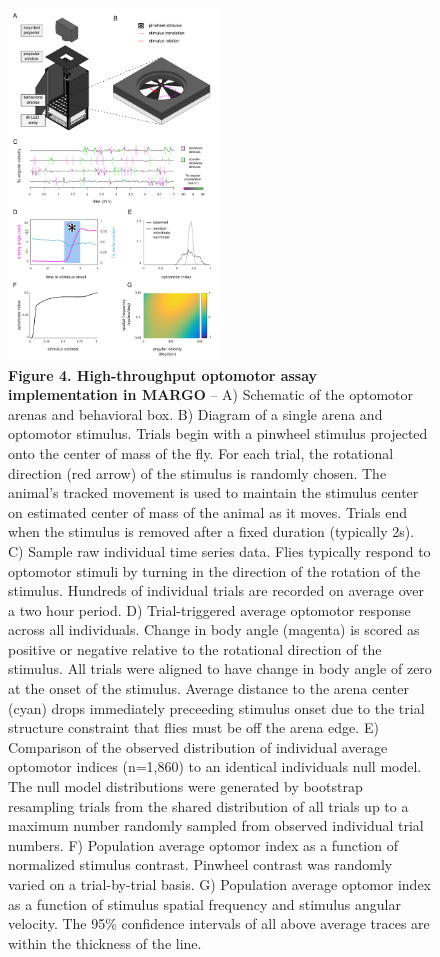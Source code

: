 \documentclass[10pt]{article}
\begin{document}
\newpage
\begin{figure}[h!]
	\begin{center}
		\includegraphics[width=0.5\textwidth]{../figures/Optomotor_panel.pdf}
	\end{center}
	\caption*{\footnotesize \textbf{Figure 4. High-throughput optomotor assay implementation in MARGO} -- A) Schematic of the optomotor arenas and behavioral box. B) Diagram of a single arena and optomotor stimulus. Trials begin with a pinwheel stimulus projected onto the center of mass of the fly. For each trial, the rotational direction (red arrow) of the stimulus is randomly chosen. The animal's tracked movement is used to maintain the stimulus center on estimated center of mass of the animal as it moves. Trials end when the stimulus is removed after a fixed duration (typically 2s). C) Sample raw individual time series data. Flies typically respond to optomotor stimuli by turning in the direction of the rotation of the stimulus. Hundreds of individual trials are recorded on average over a two hour period. D) Trial-triggered average optomotor response across all individuals. Change in body angle (magenta) is scored as positive or negative relative to the rotational direction of the stimulus. All trials were aligned to have change in body angle of zero at the onset of the stimulus. Average distance to the arena center (cyan) drops immediately preceeding stimulus onset due to the trial structure constraint that flies must be off the arena edge. E) Comparison of the observed distribution of individual average optomotor indices (n=1,860) to an identical individuals null model. The null model distributions were generated by bootstrap resampling trials from the shared distribution of all trials up to a maximum number randomly sampled from observed individual trial numbers. F) Population average optomor index as a function of normalized stimulus contrast. Pinwheel contrast was randomly varied on a trial-by-trial basis. G) Population average optomor index as a function of stimulus spatial frequency and stimulus angular velocity. The 95\% confidence intervals of all above average traces are within the thickness of the line.}
\end{figure}
\end{document}
